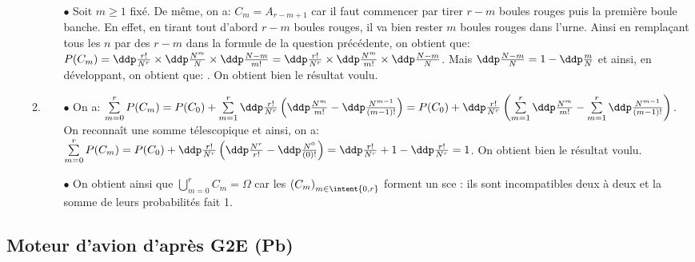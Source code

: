 \begin{correction}
\begin{enumerate}
\begin{enumerate}
\begin{itemize}
\item[$\bullet$] Soit $m\geq 1$ fix\'e. De m\^{e}me, on a: $C_m=A_{r-m+1}$ car il faut commencer par tirer $r-m$ boules rouges puis la premi\`{e}re boule banche. En effet, en tirant tout d'abord $r-m$ boules rouges, il va bien rester $m$ boules rouges dans l'urne. Ainsi en rempla\c{c}ant tous les $n$ par des $r-m$ dans la formule de la question pr\'ec\'edente, on obtient que: 
$P(C_m)=\ddp\frac{r!}{N^r}\times \ddp\frac{N^m}{N}\times \ddp\frac{N-m}{m!}=\ddp\frac{r!}{N^r}\times \ddp\frac{N^m}{m!}\times \ddp\frac{N-m}{N}$. Mais $\ddp\frac{N-m}{N}=1-\ddp\frac{m}{N}$ et ainsi, en d\'eveloppant, on obtient que: 
. On obtient bien le r\'esultat voulu.
\end{itemize}
\item 
\begin{itemize}
\item[$\bullet$] On a: $\sum\limits_{m=0}^r P(C_m)=P(C_0)+\sum\limits_{m=1}^r \ddp\frac{r!}{N^r}\left( \ddp\frac{N^m}{m!} - \ddp\frac{N^{m-1}}{(m-1)!}   \right)=P(C_0)+ \ddp\frac{r!}{N^r} \left( \sum\limits_{m=1}^r \ddp\frac{N^m}{m!}    -\sum\limits_{m=1}^r   \ddp\frac{N^{m-1}}{(m-1)!}    \right)$. On reconna\^{i}t une somme t\'elescopique et ainsi, on a: $\sum\limits_{m=0}^r P(C_m)=P(C_0) + \ddp\frac{r!}{N^r}  \left(  \ddp\frac{N^r}{r!}-  \ddp\frac{N^{0}}{(0)!}  \right)=\ddp\frac{r!}{N^r}+1-\ddp\frac{r!}{N^r}=1$. On obtient bien le r\'esultat voulu.
\item[$\bullet$] On obtient ainsi que $\bigcup\limits_{m=0}^r C_m=\Omega$ car les $\left(  C_m\right)_{m\in\intent{ 0,r}}$ forment un sce : ils sont incompatibles deux \`{a} deux et  la somme de leurs probabilit\'es fait 1.
\end{itemize}
\end{enumerate}
\end{enumerate}
\end{correction}





\subsection{Moteur d'avion d'après G2E (Pb)}

